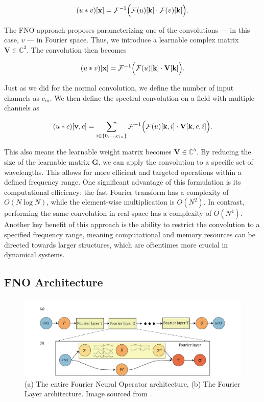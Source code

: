 \documentclass{article}
\begin{document}
\begin{equation}
    (u \ast v)[\mathbf{x}] = \mathcal{F}^{-1}\Bigl(\mathcal{F}(u)[\mathbf{k}] \cdot \mathcal{F}(v)[\mathbf{k}]\Bigr).
\end{equation}

The FNO approach proposes parameterizing one of the convolutions — in this case, $v$ — in Fourier space. Thus, we introduce a learnable complex matrix $\mathbf{V} \in \mathbb{C}^3$. The convolution then becomes

\begin{equation}
    (u \ast v)[\mathbf{x}] = \mathcal{F}^{-1}\Bigl(\mathcal{F}(u)[\mathbf{k}] \cdot \mathbf{V}[\mathbf{k}] \Bigr).
\end{equation}

Just as we did for the normal convolution, we define the number of input channels as $c_{in}$. We then define the spectral convolution on a field with multiple channels as 

\begin{equation}
    (u \ast c)[\mathbf{v}, c] = \sum_{i \in \{0, \dots, c_{in}\}} \mathcal{F}^{-1}\Bigl(\mathcal{F}(u)[\mathbf{k}, i] \cdot \mathbf{V}[\mathbf{k}, c, i] \Bigr).
\end{equation}

This also means the learnable weight matrix becomes $\mathbf{V} \in \mathbb{C}^5$. By reducing the size of the learnable matrix \(\mathbf{G}\), we can apply the convolution to a specific set of wavelengths. This allows for more efficient and targeted operations within a defined frequency range. One significant advantage of this formulation is its computational efficiency: the fast Fourier transform has a complexity of \(O(N \log N)\), while the element-wise multiplication is \(O(N^2)\). In contrast, performing the same convolution in real space has a complexity of \(O(N^4)\). Another key benefit of this approach is the ability to restrict the convolution to a specified frequency range, meaning computational and memory resources can be directed towards larger structures, which are oftentimes more crucial in dynamical systems.

\subsection{FNO Architecture}


\begin{figure}[h]
    \centering
    \includegraphics[width=0.9\linewidth]{img/Screenshot 2024-09-22 062730.png}
    \caption{(a) The entire Fourier Neural Operator architecture, (b) The Fourier Layer architecture. Image sourced from \cite{li2020fourier}.}
    \label{fig:fno-architecture}
\end{figure}
\end{document}
